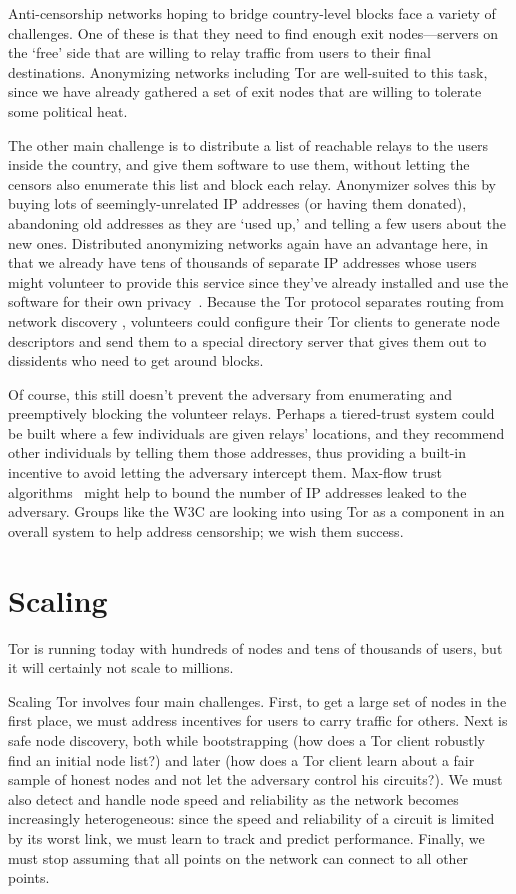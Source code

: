 \documentclass{llncs}
\begin{document}
Anti-censorship networks hoping to bridge country-level blocks face
a variety of challenges. One of these is that they need to find enough
exit nodes---servers on the `free' side that are willing to relay
traffic from users to their final destinations. Anonymizing
networks including Tor are well-suited to this task, since we have
already gathered a set of exit nodes that are willing to tolerate some
political heat.

The other main challenge is to distribute a list of reachable relays
to the users inside the country, and give them software to use them,
without letting the censors also enumerate this list and block each
relay. Anonymizer solves this by buying lots of seemingly-unrelated IP
addresses (or having them donated), abandoning old addresses as they are
`used up,' and telling a few users about the new ones. Distributed
anonymizing networks again have an advantage here, in that we already
have tens of thousands of separate IP addresses whose users might
volunteer to provide this service since they've already installed and use
the software for their own privacy~\cite{koepsell:wpes2004}. Because
the Tor protocol separates routing from network discovery \cite{tor-design},
volunteers could configure their Tor clients
to generate node descriptors and send them to a special directory
server that gives them out to dissidents who need to get around blocks.

Of course, this still doesn't prevent the adversary
from enumerating and preemptively blocking the volunteer relays.
Perhaps a tiered-trust system could be built where a few individuals are
given relays' locations, and they recommend other individuals by telling them
those addresses, thus providing a built-in incentive to avoid letting the
adversary intercept them. Max-flow trust algorithms~\cite{advogato}
might help to bound the number of IP addresses leaked to the adversary. Groups
like the W3C are looking into using Tor as a component in an overall system to
help address censorship; we wish them success.


\section{Scaling}
\label{sec:scaling}

Tor is running today with hundreds of nodes and tens of thousands of
users, but it will certainly not scale to millions.

Scaling Tor involves four main challenges. First, to get a
large set of nodes in the first place, we must address incentives for
users to carry traffic for others. Next is safe node discovery, both
while bootstrapping (how does a Tor client robustly find an initial
node list?) and later (how does a Tor client learn about a fair sample
of honest nodes and not let the adversary control his circuits?).
We must also detect and handle node speed and reliability as the network
becomes increasingly heterogeneous: since the speed and reliability
of a circuit is limited by its worst link, we must learn to track and
predict performance. Finally, we must stop assuming that all points on
the network can connect to all other points.
\end{document}
